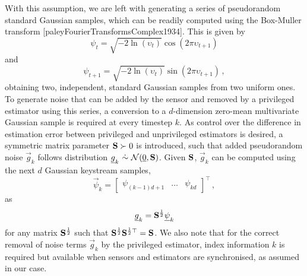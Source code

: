 With this assumption, we are left with generating a series of pseudorandom standard Gaussian samples, which can be readily computed using the Box-Muller transform [paleyFourierTransformsComplex1934]. This is given by
\begin{equation}
    \psi_t = \sqrt{-2\ln (\upsilon_t)}\cos(2\pi \upsilon_{t+1})
\end{equation}
and
\begin{equation}
    \psi_{t+1} = \sqrt{-2\ln (\upsilon_t)}\sin(2\pi \upsilon_{t+1})\,,
\end{equation}
obtaining two, independent, standard Gaussian samples from two uniform ones. To generate noise that can be added by the sensor and removed by a privileged estimator using this series, a conversion to a $d$-dimension zero-mean multivariate Gaussian sample is required at every timestep $k$. As control over the difference in estimation error between privileged and unprivileged estimators is desired, a symmetric matrix parameter ${{\mathbf{S}}}\succ 0$ is introduced, such that added pseudorandom noise $\vec{g}_k$ follows distribution $\vec{g}_k\ \dot{\sim}\ \mathcal{N}(\vec{0},\mat{S})$. Given ${{\mathbf{S}}}$, $\vec{g}_k$ can be computed using the next $d$ Gaussian keystream samples,
\begin{equation}\label{eq:priv_estimation:est_gaussian_standard_noise_stream}
    \vec{\psi}_k =
    \begin{bmatrix}
        \psi_{(k-1)d+1} & \dots & \psi_{kd}
    \end{bmatrix}^\top\,,
\end{equation}
as
\begin{equation}\label{eq:priv_estimation:est_gaussian_noise_stream}
    {\underline{g}}_k = {{\mathbf{S}}}^{\frac{1}{2}}{\underline{\psi}}_k
\end{equation}
for any matrix ${{\mathbf{S}}}^{\frac{1}{2}}$ such that ${{\mathbf{S}}}^{\frac{1}{2}}{{\mathbf{S}}}^{\frac{1}{2}\top}={{\mathbf{S}}}$. We also note that for the correct removal of noise terms $\vec{g}_k$ by the privileged estimator, index information $k$ is required but available when sensors and estimators are synchronised, as assumed in our case.

% 
% 

